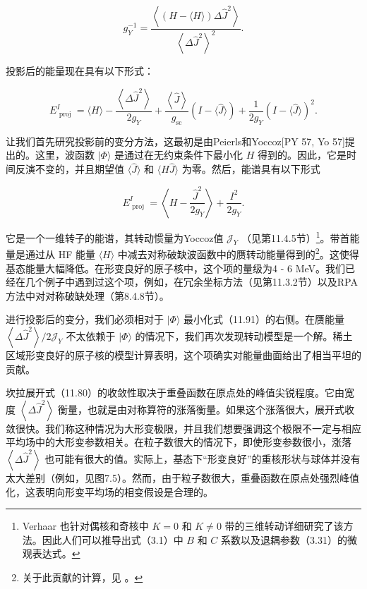 \[
{g}^{-1}_{Y}=\frac{\left\langle \left(H-\langle H\rangle\right)\Delta{\widehat{J}}^{2}\right\rangle }{{\left\langle \Delta{\widehat{J}}^{2}\right\rangle }^{2}}.\tag{11.90}
\]

投影后的能量现在具有以下形式：

\[
{E}^{I}_{\text{ proj }}=\langle H\rangle-\frac{\left\langle \Delta{\widehat{J}}^{2}\right\rangle }{2{g}_{Y}}+\frac{\left\langle \widehat{J}\right\rangle }{{g}_{\mathrm{{sc}}}}\left({I-\langle\widehat{J}\rangle}\right)+\frac{1}{2{g}_{Y}}{\left(I-\langle\widehat{J}\rangle\right)}^{2}.\tag{11.91}
\]

让我们首先研究投影前的变分方法，这最初是由Peierls和Yoccoz{[}PY 57, Yo 57{]}提出的。这里，波函数 $|\Phi\rangle$
是通过在无约束条件下最小化 $H$ 得到的。因此，它是时间反演不变的，并且期望值 $\langle\widehat{J}\rangle$
和 $\langle H\widehat{J}\rangle$ 为零。然后，能谱具有以下形式

\[
{E}^{I}_{\text{ proj }}=\left\langle {H-\frac{{\widehat{J}}^{2}}{2{g}_{Y}}}\right\rangle +\frac{{I}^{2}}{2{g}_{Y}}.\tag{11.92}
\]

它是一个一维转子的能谱，其转动惯量为Yoccoz值 $\mathcal{J}_{Y}$ （见第11.4.5节）\footnote{Verhaar \cite{Ve63,Ve64} 也针对偶核和奇核中 $K=0$ 和 $K\neq0$ 带的三维转动详细研究了该方法。因此人们可以推导出式（3.1）中
$B$ 和 $C$ 系数以及退耦参数（3.31）的微观表达式。}。带首能量是通过从 HF 能量 $\langle H\rangle$ 中减去对称破缺波函数中的赝转动能量得到的\footnote{关于此贡献的计算，见 \cite{ZN77,VLS79,ER80}。}。这使得基态能量大幅降低。在形变良好的原子核中，这个项的量级为4
- 6 MeV。我们已经在几个例子中遇到过这个项，例如，在冗余坐标方法（见第11.3.2节）以及RPA方法中对对称破缺处理（第8.4.8节）。

进行投影后的变分，我们必须相对于 $|\Phi\rangle$ 最小化式（11.91）的右侧。在赝能量 $\left\langle {\Delta{\widehat{J}}^{2}}\right\rangle /2{\mathcal{J}}_{Y}$
不太依赖于 $|\Phi\rangle$ 的情况下，我们再次发现转动模型是一个解。稀土区域形变良好的原子核的模型计算\cite{BMR70}表明，这个项确实对能量曲面给出了相当平坦的贡献。

坎拉展开式（11.80）的收敛性取决于重叠函数在原点处的峰值尖锐程度。它由宽度 $\left\langle {\Delta{\widehat{J}}^{2}}\right\rangle $
衡量，也就是由对称算符的涨落衡量。如果这个涨落很大，展开式收敛很快。我们称这种情况为大形变极限，并且我们想要强调这个极限不一定与相应平均场中的大形变参数相关。在粒子数很大的情况下，即使形变参数很小，涨落
$\left\langle {\Delta{\widehat{J}}^{2}}\right\rangle $ 也可能有很大的值。实际上，基态下“形变良好”的重核形状与球体并没有太大差别（例如，见图7.5）。然而，由于粒子数很大，重叠函数在原点处强烈峰值化，这表明向形变平均场的相变假设是合理的。

